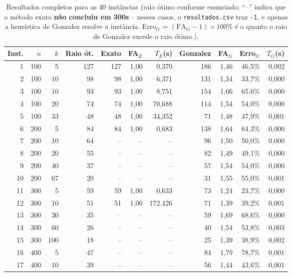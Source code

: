 \documentclass[10pt,twocolumn]{article}
\begin{document}
\begin{table}[t]
\centering
\caption{Resultados completos para as 40 inst\^ancias (raio \'otimo conforme enunciado; ``--'' indica que o m\'etodo exato \textbf{n\~ao concluiu em 300s} -- nesses casos, o \texttt{resultados.csv} traz \texttt{-1}, e apenas a heur\'istica de Gonzalez resolve a inst\^ancia. Erro$_G$ = $(\mathrm{FA}_G-1)\times100\%$ \'e o quanto o raio de Gonzalez excede o raio \'otimo.).}
\label{tab:resultados}
\footnotesize
\begin{tabular}{rrrr|rrr|rrrr}
\toprule
Inst. & $n$ & $k$ & Raio \'ot. & Exato & FA$_E$ & $T_E$(s) & Gonzalez & FA$_G$ & Erro$_G$ & $T_G$(s) \\
\midrule
1  & 100 & 5   & 127 & 127 & 1,00 & 0,370   & 186 & 1,46 & 46,5\% & 0,002 \\
2  & 100 & 10  & 98  & 98  & 1,00 & 6,371   & 131 & 1,34 & 33,7\% & 0,000 \\
3  & 100 & 10  & 93  & 93  & 1,00 & 8,751   & 154 & 1,66 & 65,6\% & 0,000 \\
4  & 100 & 20  & 74  & 74  & 1,00 & 70,688  & 114 & 1,54 & 54,0\% & 0,000 \\
5  & 100 & 33  & 48  & 48  & 1,00 & 34,352  & 71  & 1,48 & 47,9\% & 0,001 \\
6  & 200 & 5   & 84  & 84  & 1,00 & 0,683   & 138 & 1,64 & 64,3\% & 0,000 \\
7  & 200 & 10  & 64  & --  & --   & --      & 96  & 1,50 & 50,0\% & 0,000 \\
8  & 200 & 20  & 55  & --  & --   & --      & 82  & 1,49 & 49,1\% & 0,000 \\
9  & 200 & 40  & 37  & --  & --   & --      & 57  & 1,54 & 54,0\% & 0,000 \\
10 & 200 & 67  & 20  & --  & --   & --      & 31  & 1,55 & 55,0\% & 0,001 \\
11 & 300 & 5   & 59  & 59  & 1,00 & 0,633   & 73  & 1,24 & 23,7\% & 0,000 \\
12 & 300 & 10  & 51  & 51  & 1,00 & 172,426 & 71  & 1,39 & 39,2\% & 0,001 \\
13 & 300 & 30  & 35  & --  & --   & --      & 59  & 1,69 & 68,6\% & 0,000 \\
14 & 300 & 60  & 26  & --  & --   & --      & 40  & 1,54 & 53,8\% & 0,003 \\
15 & 300 & 100 & 18  & --  & --   & --      & 25  & 1,39 & 38,9\% & 0,002 \\
16 & 400 & 5   & 47  & --  & --   & --      & 84  & 1,79 & 78,7\% & 0,001 \\
17 & 400 & 10  & 39  & --  & --   & --      & 56  & 1,44 & 43,6\% & 0,001 \\

\end{tabular}
\end{table}
\end{document}
